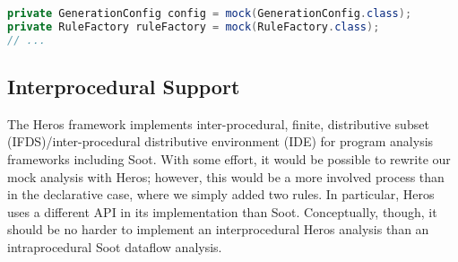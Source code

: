 

\begin{lstlisting}[basicstyle=\ttfamily, caption={Example for field mocks defined by field initializations from \texttt{TypeRuleTest.java} in jsonschema2pojo.},
basicstyle=\ttfamily,language = Java, framesep=4.5mm,
framexleftmargin=1mm, captionpos=b, label=lis:fieldMock]
private GenerationConfig config = mock(GenerationConfig.class);
private RuleFactory ruleFactory = mock(RuleFactory.class);
// ...
\end{lstlisting}

\subsection{Interprocedural Support} 

The Heros framework\cite{bodden12:_inter_proced_data_flow_analy} implements inter-procedural, finite, distributive subset (IFDS)/inter-procedural distributive environment (IDE) for program analysis frameworks including Soot. With some effort, it would be possible to rewrite our mock analysis with Heros; however, this would be a more involved process than in the declarative case, where we simply added two rules. In particular, Heros uses a different API in its implementation than Soot. Conceptually, though, it should be no harder to implement an interprocedural Heros analysis than an intraprocedural Soot dataflow analysis.


